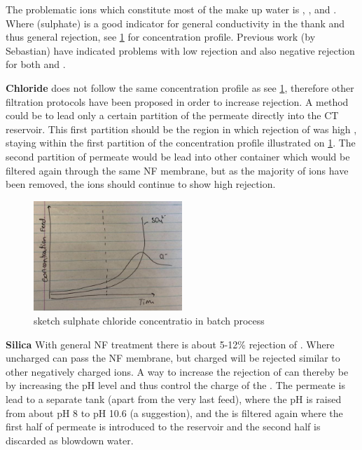 The problematic ions which constitute most of the make up water is , ,  and .
Where  (sulphate) is a good indicator for general conductivity in the thank and thus general rejection, see \cref{fig:sulphate_chlroide_concentration_batch} for concentration profile. 
Previous work (by Sebastian) have indicated problems with low rejection and also negative rejection for both  and .

\textbf{Chloride}
 does not follow the same concentration profile as  see \cref{fig:sulphate_chlroide_concentration_batch}, therefore other filtration protocols have been proposed in order to increase rejection. 
A method could be to lead only a certain partition of the permeate directly into the CT reservoir.
This first partition should be the region in which rejection of  was high , staying within the first partition of the concentration profile illustrated on \cref{fig:sulphate_chlroide_concentration_batch}. 
The second partition of permeate would be lead into other container which would be filtered again through the same NF membrane, but as the majority of  ions have been removed, the  ions should continue to show high rejection. 




\begin{figure}[H] %
	\centering
	\includegraphics[width=0.5\textwidth]{Billeder/intro/sulphate_chloride_rejection.JPG}
	\caption{ sketch sulphate chloride concentratio in batch process}
	\label{fig:sulphate_chlroide_concentration_batch}
\end{figure}

\textbf{Silica}
With general NF treatment there is about 5-12\% rejection of . Where uncharged  can pass the NF membrane, but charged  will be rejected similar to other negatively charged ions.
A way to increase the rejection of  can thereby be by increasing the pH level and thus control the charge of the . 
The permeate is lead to a separate tank (apart from the very last feed), where the pH is raised from about pH 8 to pH 10.6 (a suggestion), and the is filtered again where the first half of permeate is introduced to the reservoir and the second half is discarded as blowdown water. 



